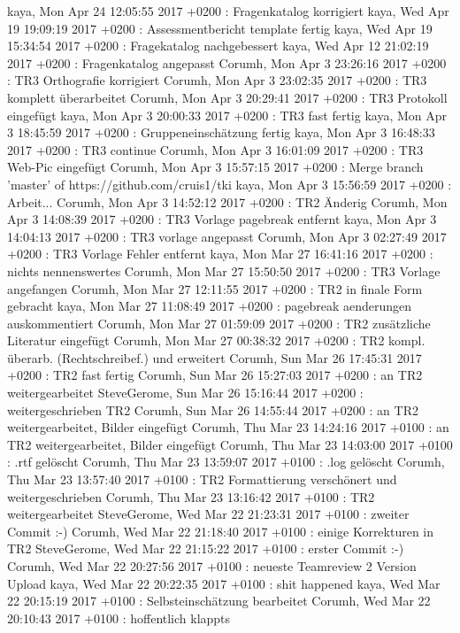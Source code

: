 kaya, Mon Apr 24 12:05:55 2017 +0200 : Fragenkatalog korrigiert
kaya, Wed Apr 19 19:09:19 2017 +0200 : Assessmentbericht template fertig
kaya, Wed Apr 19 15:34:54 2017 +0200 : Fragekatalog nachgebessert
kaya, Wed Apr 12 21:02:19 2017 +0200 : Fragenkatalog angepasst
Corumh, Mon Apr 3 23:26:16 2017 +0200 : TR3 Orthografie korrigiert
Corumh, Mon Apr 3 23:02:35 2017 +0200 : TR3 komplett überarbeitet
Corumh, Mon Apr 3 20:29:41 2017 +0200 : TR3 Protokoll eingefügt
kaya, Mon Apr 3 20:00:33 2017 +0200 : TR3 fast fertig
kaya, Mon Apr 3 18:45:59 2017 +0200 : Gruppeneinschätzung fertig
kaya, Mon Apr 3 16:48:33 2017 +0200 : TR3 continue
Corumh, Mon Apr 3 16:01:09 2017 +0200 : TR3 Web-Pic eingefügt
Corumh, Mon Apr 3 15:57:15 2017 +0200 : Merge branch 'master' of https://github.com/cruis1/tki
kaya, Mon Apr 3 15:56:59 2017 +0200 : Arbeit...
Corumh, Mon Apr 3 14:52:12 2017 +0200 : TR2 Änderig
Corumh, Mon Apr 3 14:08:39 2017 +0200 : TR3 Vorlage pagebreak entfernt
kaya, Mon Apr 3 14:04:13 2017 +0200 : TR3 vorlage angepasst
Corumh, Mon Apr 3 02:27:49 2017 +0200 : TR3 Vorlage Fehler entfernt
kaya, Mon Mar 27 16:41:16 2017 +0200 : nichts nennenswertes
Corumh, Mon Mar 27 15:50:50 2017 +0200 : TR3 Vorlage angefangen
Corumh, Mon Mar 27 12:11:55 2017 +0200 : TR2 in finale Form gebracht
kaya, Mon Mar 27 11:08:49 2017 +0200 : pagebreak aenderungen auskommentiert
Corumh, Mon Mar 27 01:59:09 2017 +0200 : TR2 zusätzliche Literatur eingefügt
Corumh, Mon Mar 27 00:38:32 2017 +0200 : TR2 kompl. überarb. (Rechtschreibef.) und erweitert
Corumh, Sun Mar 26 17:45:31 2017 +0200 : TR2 fast fertig
Corumh, Sun Mar 26 15:27:03 2017 +0200 : an TR2 weitergearbeitet
SteveGerome, Sun Mar 26 15:16:44 2017 +0200 : weitergeschrieben TR2
Corumh, Sun Mar 26 14:55:44 2017 +0200 : an TR2 weitergearbeitet, Bilder eingefügt
Corumh, Thu Mar 23 14:24:16 2017 +0100 : an TR2 weitergearbeitet, Bilder eingefügt
Corumh, Thu Mar 23 14:03:00 2017 +0100 : .rtf gelöscht
Corumh, Thu Mar 23 13:59:07 2017 +0100 : .log gelöscht
Corumh, Thu Mar 23 13:57:40 2017 +0100 : TR2 Formattierung verschönert und weitergeschrieben
Corumh, Thu Mar 23 13:16:42 2017 +0100 : TR2 weitergearbeitet
SteveGerome, Wed Mar 22 21:23:31 2017 +0100 : zweiter Commit :-)
Corumh, Wed Mar 22 21:18:40 2017 +0100 : einige Korrekturen in TR2
SteveGerome, Wed Mar 22 21:15:22 2017 +0100 : erster Commit :-)
Corumh, Wed Mar 22 20:27:56 2017 +0100 : neueste Teamreview 2 Version Upload
kaya, Wed Mar 22 20:22:35 2017 +0100 : shit happened
kaya, Wed Mar 22 20:15:19 2017 +0100 : Selbsteinschätzung bearbeitet
Corumh, Wed Mar 22 20:10:43 2017 +0100 : hoffentlich klappts
